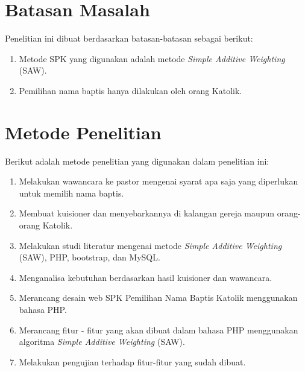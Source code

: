 \section{Batasan Masalah}
\label{sec:batasan_masalah}
Penelitian ini dibuat berdasarkan batasan-batasan sebagai berikut:
	\begin{enumerate}
		\item Metode SPK yang digunakan adalah metode \textit{Simple Additive Weighting} (SAW).
		\item Pemilihan nama baptis hanya dilakukan oleh orang Katolik.
	\end{enumerate}
	
\section{Metode Penelitian}
\label{sec:metode_penelitian}
Berikut adalah metode penelitian yang digunakan dalam penelitian ini:
	\begin{enumerate}
		\item Melakukan wawancara ke pastor mengenai syarat apa saja yang diperlukan untuk memilih nama baptis.
		\item Membuat kuisioner dan menyebarkannya di kalangan gereja maupun orang-orang Katolik.
		\item Melakukan studi literatur mengenai metode \textit{Simple Additive Weighting} (SAW), PHP, bootstrap, dan MySQL.
		\item Menganalisa kebutuhan berdasarkan hasil kuisioner dan wawancara.
		\item Merancang desain web SPK Pemilihan Nama Baptis Katolik menggunakan bahasa PHP.
		\item Merancang fitur - fitur yang akan dibuat dalam bahasa PHP menggunakan algoritma \textit{Simple Additive Weighting} (SAW).
		\item Melakukan pengujian terhadap fitur-fitur yang sudah dibuat.
	\end{enumerate}

